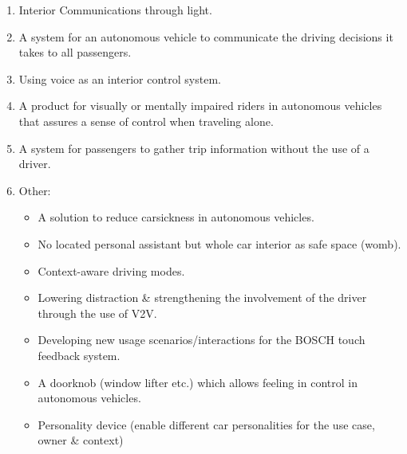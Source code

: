     \begin{enumerate}
    \item Interior Communications through light.
    \item A system for an autonomous vehicle to communicate the driving decisions it takes to all passengers.
    \item Using voice as an interior control system.
    \item A product for visually or mentally impaired riders in autonomous vehicles that assures a sense of control when traveling alone.
    \item A system for passengers to gather trip information without the use of a driver.
    \item Other:
    \begin{itemize}
    \item A solution to reduce carsickness in autonomous vehicles.
    \item No located personal assistant but whole car interior as safe space (womb).
    \item Context-aware driving modes.
    \item Lowering distraction \& strengthening the involvement of the driver through the use of V2V.
    \item Developing new usage scenarios/interactions for the BOSCH touch feedback system.
    \item A doorknob (window lifter etc.) which allows feeling in control in autonomous vehicles.
    \item Personality device (enable different car personalities for the use case, owner \& context)
\end{itemize}
    \end{enumerate}

